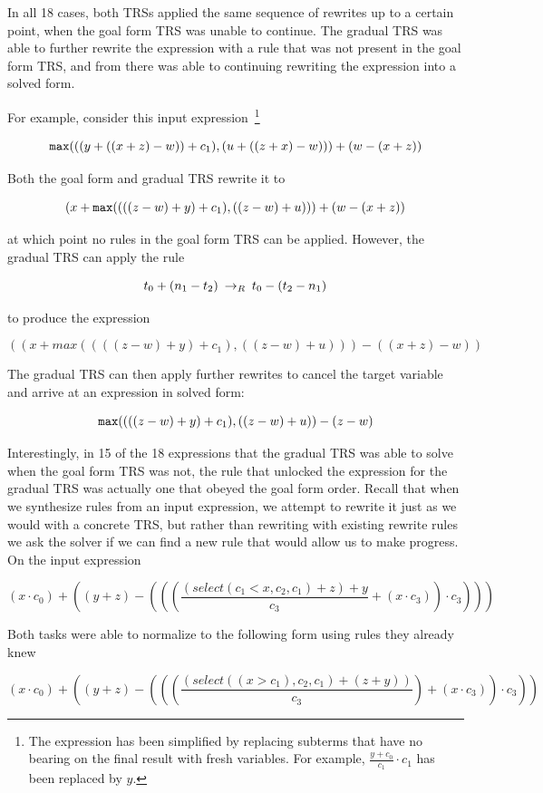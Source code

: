 In all 18 cases, both TRSs applied the same sequence of rewrites up to a certain point, when the goal form TRS was unable to continue. The gradual TRS was able to further rewrite the expression with a rule that was not present in the goal form TRS, and from there was able to continuing rewriting the expression into a solved form.

For example, consider this input expression~\footnote{The expression has been simplified by replacing subterms that have no bearing on the final result with fresh variables. For example, $\frac{y + c_0}{c_1} \cdot c_1$ has been replaced by $y$.}

\[ \texttt{max}{(((y + ((x + z) - w)) + c_1), (u + ((z + x) - w)))} + (w - (x + z))
\]

Both the goal form and gradual TRS rewrite it to

\[ (x + \texttt{max}{((((z - w) + y) + c_1), ((z - w) + u))}) + (w - (x + z))
\]

at which point no rules in the goal form TRS can be applied. However, the gradual TRS can apply the rule

\[ t_0 + (n_1 - t_2) \:\rightarrow_{R}\: t_0 - (t_2 - n_1)
\]

to produce the expression

\[ ((x + max((((z - w) + y) + c_1), ((z - w) + u))) - ((x + z) - w))
\]

The gradual TRS can then apply further rewrites to cancel the target variable and arrive at an expression in solved form:

\[ \texttt{max}{((((z - w) + y) + c_1), ((z - w) + u))} - (z - w)
\]

Interestingly, in 15 of the 18 expressions that the gradual TRS was able to solve when the goal form TRS was not, the rule that unlocked the expression for the gradual TRS was actually one that obeyed the goal form order. Recall that when we synthesize rules from an input expression, we attempt to rewrite it just as we would with a concrete TRS, but rather than rewriting with existing rewrite rules we ask the solver if we can find a new rule that would allow us to make progress. On the input expression

\[ (x \cdot c_0) + ((y + z) - (((\frac{(select(c_1 < x, c_2, c_1) + z) + y}{c_3} + (x \cdot c_3)) \cdot c_3)))
\]

Both tasks were able to normalize to the following form using rules they already knew

\[ (x \cdot c_0) + ((y + z) - (((\frac{(select((x > c_1), c_2, c_1) + (z + y))}{c_3}) + (x \cdot c_3)) \cdot c_3))
\]

